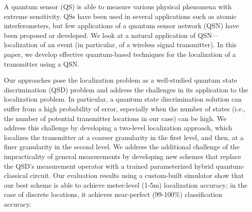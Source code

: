 A quantum sensor (QS) is able to measure various physical phenomena with extreme sensitivity.
QSs have been used in several applications such as atomic interferometers, but few applications of a quantum sensor network (QSN) have been proposed or developed.
We look at a natural application of QSN---localization of an event (in particular, of a wireless signal transmitter).
In this paper, we develop effective quantum-based techniques for the localization of a transmitter using a QSN.

Our approaches pose the localization problem as a well-studied quantum state discrimination (QSD) problem and address the challenges in its application to the localization problem. 
In particular, a quantum state discrimination solution can suffer from a high probability of 
error, especially when the number of states (i.e., the number of potential transmitter locations in our case) can be high. 
We address this challenge by developing a two-level localization approach, which localizes the transmitter at a coarser granularity in the first level, and then, at a finer granularity in the second level. 
We address the additional challenge of the impracticality of general measurements by 
developing new schemes that replace the QSD's measurement operator with a trained parameterized hybrid quantum-classical circuit.
Our evaluation results using a custom-built simulator show that our best scheme is able to 
achieve meter-level (1-5m) localization accuracy; 
in the case of discrete locations, 
it achieves near-perfect (99-100\%) classification accuracy. 